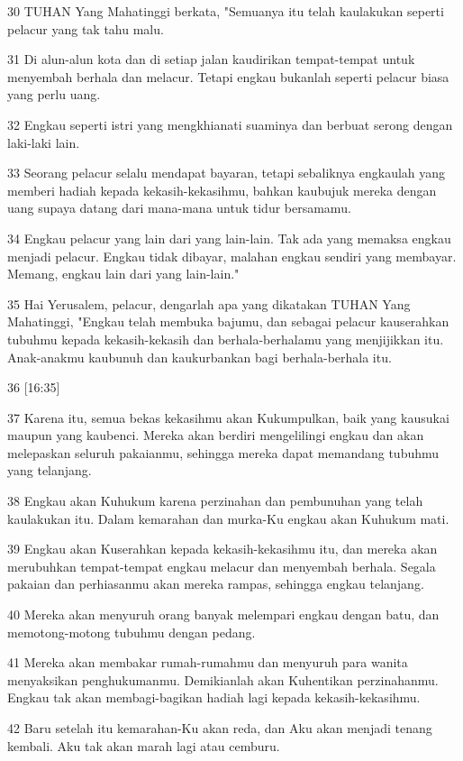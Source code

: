 \par 30 TUHAN Yang Mahatinggi berkata, "Semuanya itu telah kaulakukan seperti pelacur yang tak tahu malu.
\par 31 Di alun-alun kota dan di setiap jalan kaudirikan tempat-tempat untuk menyembah berhala dan melacur. Tetapi engkau bukanlah seperti pelacur biasa yang perlu uang.
\par 32 Engkau seperti istri yang mengkhianati suaminya dan berbuat serong dengan laki-laki lain.
\par 33 Seorang pelacur selalu mendapat bayaran, tetapi sebaliknya engkaulah yang memberi hadiah kepada kekasih-kekasihmu, bahkan kaubujuk mereka dengan uang supaya datang dari mana-mana untuk tidur bersamamu.
\par 34 Engkau pelacur yang lain dari yang lain-lain. Tak ada yang memaksa engkau menjadi pelacur. Engkau tidak dibayar, malahan engkau sendiri yang membayar. Memang, engkau lain dari yang lain-lain."
\par 35 Hai Yerusalem, pelacur, dengarlah apa yang dikatakan TUHAN Yang Mahatinggi, "Engkau telah membuka bajumu, dan sebagai pelacur kauserahkan tubuhmu kepada kekasih-kekasih dan berhala-berhalamu yang menjijikkan itu. Anak-anakmu kaubunuh dan kaukurbankan bagi berhala-berhala itu.
\par 36 [16:35]
\par 37 Karena itu, semua bekas kekasihmu akan Kukumpulkan, baik yang kausukai maupun yang kaubenci. Mereka akan berdiri mengelilingi engkau dan akan melepaskan seluruh pakaianmu, sehingga mereka dapat memandang tubuhmu yang telanjang.
\par 38 Engkau akan Kuhukum karena perzinahan dan pembunuhan yang telah kaulakukan itu. Dalam kemarahan dan murka-Ku engkau akan Kuhukum mati.
\par 39 Engkau akan Kuserahkan kepada kekasih-kekasihmu itu, dan mereka akan merubuhkan tempat-tempat engkau melacur dan menyembah berhala. Segala pakaian dan perhiasanmu akan mereka rampas, sehingga engkau telanjang.
\par 40 Mereka akan menyuruh orang banyak melempari engkau dengan batu, dan memotong-motong tubuhmu dengan pedang.
\par 41 Mereka akan membakar rumah-rumahmu dan menyuruh para wanita menyaksikan penghukumanmu. Demikianlah akan Kuhentikan perzinahanmu. Engkau tak akan membagi-bagikan hadiah lagi kepada kekasih-kekasihmu.
\par 42 Baru setelah itu kemarahan-Ku akan reda, dan Aku akan menjadi tenang kembali. Aku tak akan marah lagi atau cemburu.
